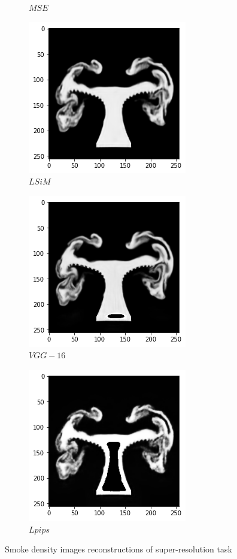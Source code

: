 \documentclass[a4paper,12pt,twoside]{report}
\begin{document}
\begin{figure}
\begin{subfigure}{0.32\textwidth}
		\caption{$MSE$}
	\end{subfigure}
	\begin{subfigure}{0.32\textwidth}
		\centering
		\includegraphics[scale=0.4]{superresolution/density_lsim.png}
		\caption{$LSiM$}
	\end{subfigure}
	\begin{subfigure}{0.32\textwidth}
		\centering
		\includegraphics[scale=0.4]{superresolution/density_vgg.png}
		\caption{$VGG-16$}
	\end{subfigure}
	\begin{subfigure}{0.32\textwidth}
		\centering
		\includegraphics[scale=0.4]{superresolution/density_lpips.png}
		\caption{$Lpips$}
	\end{subfigure}
	\caption{Smoke density images reconstructions of super-resolution task }
	\label{super density}
\end{figure}
\end{document}
